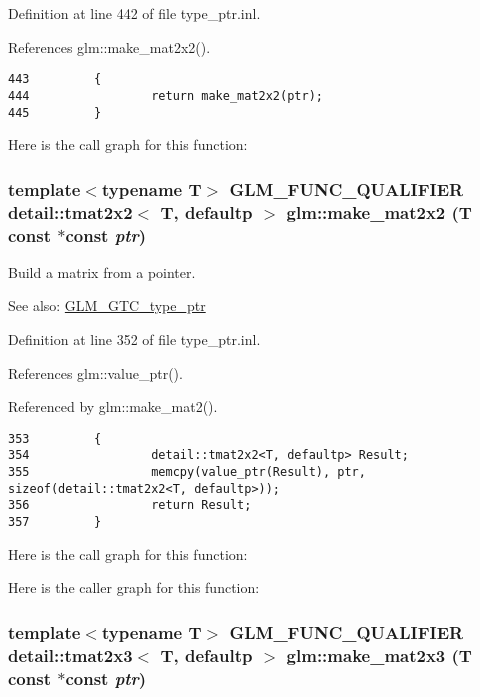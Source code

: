 Definition at line 442 of file type\_\-ptr.inl.

References glm::make\_\-mat2x2().

\begin{Code}\begin{verbatim}443         {
444                 return make_mat2x2(ptr);
445         }
\end{verbatim}
\end{Code}




Here is the call graph for this function:\hypertarget{group__gtc__type__ptr_g49c18920c113e1e72caea1c3978c8e7f}{
\subsubsection[make\_\-mat2x2]{\setlength{\rightskip}{0pt plus 5cm}template$<$typename T$>$ GLM\_\-FUNC\_\-QUALIFIER detail::tmat2x2$<$ T, defaultp $>$ glm::make\_\-mat2x2 (T const $\ast$const  {\em ptr})}}
\label{group__gtc__type__ptr_g49c18920c113e1e72caea1c3978c8e7f}


Build a matrix from a pointer. \begin{Desc}
\item[See also:]\hyperlink{group__gtc__type__ptr}{GLM\_\-GTC\_\-type\_\-ptr} \end{Desc}


Definition at line 352 of file type\_\-ptr.inl.

References glm::value\_\-ptr().

Referenced by glm::make\_\-mat2().

\begin{Code}\begin{verbatim}353         {
354                 detail::tmat2x2<T, defaultp> Result;
355                 memcpy(value_ptr(Result), ptr, sizeof(detail::tmat2x2<T, defaultp>));
356                 return Result;
357         }
\end{verbatim}
\end{Code}




Here is the call graph for this function:

Here is the caller graph for this function:\hypertarget{group__gtc__type__ptr_g86620b90c993ff8e31f0dff1611bd2da}{
\subsubsection[make\_\-mat2x3]{\setlength{\rightskip}{0pt plus 5cm}template$<$typename T$>$ GLM\_\-FUNC\_\-QUALIFIER detail::tmat2x3$<$ T, defaultp $>$ glm::make\_\-mat2x3 (T const $\ast$const  {\em ptr})}}
\label{group__gtc__type__ptr_g86620b90c993ff8e31f0dff1611bd2da}



